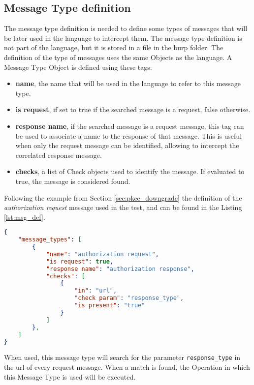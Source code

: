 \subsection{Message Type definition}
The message type definition is needed to define some types of messages that will be later used in the language to intercept them.
The message type definition is not part of the language, but it is stored in a file in the \Gls{burp} folder. The definition of the type of messages uses the same Objects as the language.
A Message Type Object is defined using these tags:
\begin{itemize}
    \item \textbf{name}, the name that will be used in the language to refer to this message type.
    \item \textbf{is request}, if set to true if the searched message is a request, false otherwise.
    \item \textbf{response name}, if the searched message is a request message, this tag can be used to associate a name to the response of that message. This is useful when only the request message can be identified, allowing to intercept the correlated response message.
    \item \textbf{checks}, a list of Check objects used to identify the message. If evaluated to true, the message is considered found.
\end{itemize}

Following the example from Section \ref{sec:pkce_downgrade} the definition of the \textit{authorization request} message used in the test, and can be found in the Listing \ref{lst:msg_def}.

\begin{lstlisting}[language=json, caption=Message Types definition, label={lst:msg_def}]
{
    "message_types": [
        {
            "name": "authorization request",
            "is request": true,
            "response name": "authorization response",
            "checks": [
                {
                    "in": "url",
                    "check param": "response_type",
                    "is present": "true"
                }
            ]
        },
    ]
}
\end{lstlisting}

When used, this message type will search for the parameter \texttt{response\_type} in the url of every request message. When a match is found, the Operation in which this Message Type is used will be executed.

